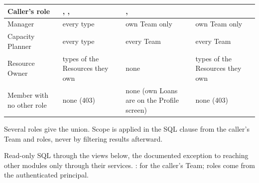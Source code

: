 {\footnotesize\setlength{\tabcolsep}{4pt}\renewcommand{\arraystretch}{1.1}
\begin{tabularx}{\textwidth}{@{}L{3.2cm}YYL{3.2cm}@{}}
\toprule
\textbf{Caller's role} & \textbf{, , } & \textbf{, } & \textbf{} \\
\midrule
Manager & every type & own Team only & own Team only \\
Capacity Planner & every type & every Team & every Team \\
Resource Owner & types of the Resources they own & none & types of the Resources they own \\
Member with no other role & none (403) & none (own Loans are on the Profile screen) & none (403) \\
\bottomrule
\end{tabularx}\par}
Several roles give the union. Scope is applied in the SQL  clause from the caller's Team and roles, never by filtering results afterward.

Read-only SQL through the views below, the documented exception to reaching other modules only through their services. :  for the caller's Team; roles come from the authenticated principal.

